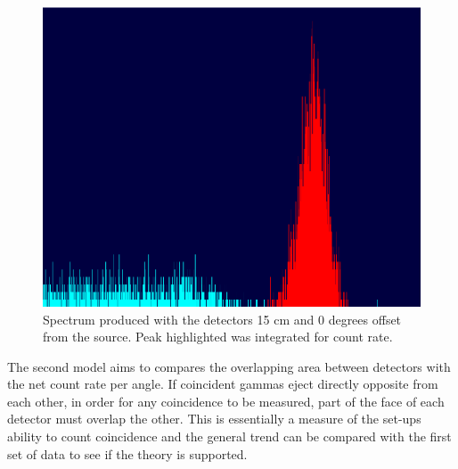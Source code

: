 \documentclass[12pt, letterpaper, twocolumn]{article}
\begin{document}
\begin{figure}[H]
    \centering
    \includegraphics[width=0.45\linewidth]{Figures/sample_spectrum.png}
    \caption{Spectrum produced with the detectors 15 cm and 0 degrees offset
    from the source. Peak highlighted was integrated for count rate.}
    \label{figure:spectrum}
\end{figure}
The second model aims to compares the overlapping area between detectors with
the net count rate per angle. If coincident gammas eject directly opposite from
each other, in order for any coincidence to be measured, part of the face of
each
detector must overlap the other. This is essentially a measure of the set-ups
ability to count coincidence and the general trend can be compared with the
first set of data to see if the theory is supported.
\end{document}
